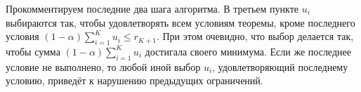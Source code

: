 \documentclass[12pt,a4paper]{article}
\DeclareMathOperator*{\argmax}{arg\,max}
\newtheorem{theorem}{Теорема}
\begin{document}
	Прокомментируем последние два шага алгоритма. В третьем пункте $u_i$ выбираются так, чтобы удовлетворять всем условиям теоремы, кроме последнего условия $(1 - \alpha) \sum_{i=1}^K u_i \le r_{K+1}$. При этом очевидно, что выбор делается так, чтобы сумма $(1 - \alpha) \sum_{i=1}^K u_i$ достигала своего минимума. Если же последнее условие не выполнено, то любой иной выбор $u_i$, удовлетворяющий последнему условию, приведёт к нарушению предыдущих ограничений.

%	
%		
%		
\end{document}
